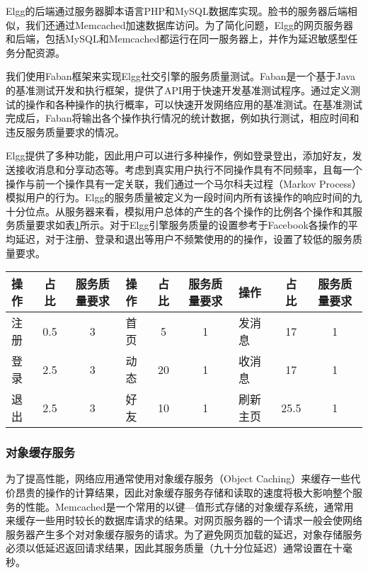 Elgg的后端通过服务器脚本语言PHP和MySQL数据库实现。脸书的服务器后端相似\cite{nishtala2013scaling}，我们还通过Memcached加速数据库访问。为了简化问题，Elgg的网页服务器和后端，包括MySQL和Memcached都运行在同一服务器上，并作为延迟敏感型任务分配资源。

我们使用Faban框架来实现Elgg社交引擎的服务质量测试。Faban是一个基于Java的基准测试开发和执行框架，提供了API用于快速开发基准测试程序。通过定义测试的操作和各种操作的执行概率，可以快速开发网络应用的基准测试。在基准测试完成后，Faban将输出各个操作执行情况的统计数据，例如执行测试，相应时间和违反服务质量要求的情况。

Elgg提供了多种功能，因此用户可以进行多种操作，例如登录登出，添加好友，发送接收消息和分享动态等。考虑到真实用户执行不同操作具有不同频率，且每一个操作与前一个操作具有一定关联，我们通过一个马尔科夫过程（Markov Process）模拟用户的行为。Elgg的服务质量被定义为一段时间内所有该操作的响应时间的九十分位点。从服务器来看，模拟用户总体的产生的各个操作的比例各个操作和其服务质量要求如表\ref{tab:mix}所示。对于Elgg引擎服务质量的设置参考于Facebook各操作的平均延迟\cite{alexa2016}，对于注册、登录和退出等用户不频繁使用的的操作，设置了较低的服务质量要求。

\begin{table}[!htp]
  \centering
  \label{tab:mix}
  \begin{tabular}{@{}lcc|lcc|lcc@{}} \toprule
    操作 & 占比 & 服务质量要求 & 操作 & 占比 & 服务质量要求 & 操作 & 占比 & 服务质量要求\\ 
    \midrule
    注册 & 0.5 & 3 & 首页 & 5 & 1 & 发消息 & 17 & 1 \\
    登录 & 2.5 & 3 & 动态 & 20 & 1 & 收消息 & 17 & 1 \\
    退出 & 2.5 & 3 & 好友 & 10 & 1 & 刷新主页 & 25.5 & 1\\
    \bottomrule
  \end{tabular}  
\end{table}

\subsubsection{对象缓存服务}
为了提高性能，网络应用通常使用对象缓存服务（Object Caching）来缓存一些代价昂贵的操作的计算结果，因此对象缓存服务存储和读取的速度将极大影响整个服务的性能。Memcached是一个常用的以键—值形式存储的对象缓存系统，通常用来缓存一些用时较长的数据库请求的结果。对网页服务器的一个请求一般会使网络服务器产生多个对对象缓存服务的请求。为了避免网页加载的延迟，对象存储服务必须以低延迟返回请求结果，因此其服务质量（九十分位延迟）通常设置在十毫秒。

